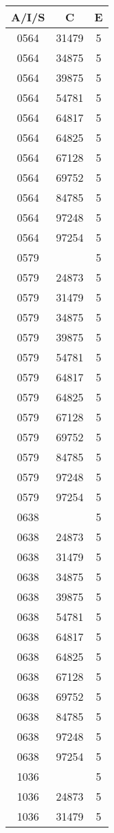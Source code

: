 {{\begin{tabular}{|c|c||c|}
        \hline
        \bf A/I/S & \bf C & \bf E \\
        \hline
0564&31479&5\\ 0564&34875&5\\ 0564&39875&5\\ 0564&54781&5\\ 0564&64817&5\\ 0564&64825&5\\ 0564&67128&5\\ 0564&69752&5\\ 0564&84785&5\\ 0564&97248&5\\ 0564&97254&5\\ 0579& &5\\ 0579&24873&5\\ 0579&31479&5\\ 0579&34875&5\\ 0579&39875&5\\ 0579&54781&5\\ 0579&64817&5\\ 0579&64825&5\\ 0579&67128&5\\ 0579&69752&5\\ 0579&84785&5\\ 0579&97248&5\\ 0579&97254&5\\ 0638& &5\\ 0638&24873&5\\ 0638&31479&5\\ 0638&34875&5\\ 0638&39875&5\\ 0638&54781&5\\ 0638&64817&5\\ 0638&64825&5\\ 0638&67128&5\\ 0638&69752&5\\ 0638&84785&5\\ 0638&97248&5\\ 0638&97254&5\\ 1036& &5\\ 1036&24873&5\\ 1036&31479&5\\ 
        \hline
        \end{tabular}
    }
}


